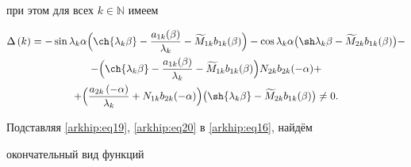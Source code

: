 при этом для всех $k\in \mathbb N$ имеем

\begin{multline}

\Delta\left({k}\right) = -\sin{\lambda_{k}\alpha}\Bigl(\ch{\lambda_{k}\beta} - \frac{a_{1k} (\beta)}{\lambda_{k}} - \widetilde M_{1 k}b_{1 k}(\beta)\Bigr) 

- \cos{\lambda_{k}\alpha}\bigl(\sh\lambda_{k}\beta - \widetilde M_{2 k}b_{1 k}(\beta)\bigr)-

\\

- \Bigl(\ch{\lambda_{k} \beta} - \frac{a_{1k} (\beta)}{\lambda_{k}} - \widetilde M_{1 k}b_{1 k}(\beta)\Bigr) N_{2 k}b_{2 k}(-\alpha) +

\\

+\Bigl( \frac{a_{2k} \left({-\alpha}\right)}{\lambda_{k}} + N_{1 k}b_{2 k}(-\alpha)\Bigr)\bigl(\sh{\lambda_{k} \beta} - \widetilde M_{2 k}b_{1 k}(\beta)\bigr)

\neq{0}.

\label{arkhip:eq21}

\end{multline}



Подставляя \eqref{arkhip:eq19}, \eqref{arkhip:eq20}  в \eqref{arkhip:eq16}, найдём

окончательный вид функций

